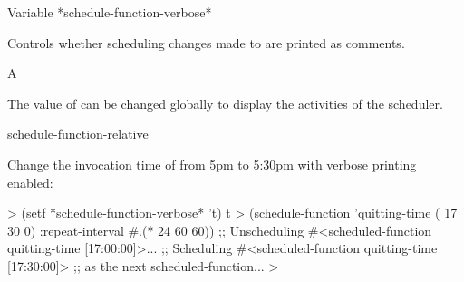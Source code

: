 
\begin{functiondoc}{Variable}%
  {*schedule-function-verbose*}{}%

\fnsyntax

\fnpurpose Controls whether scheduling changes made to
 are printed as comments. 

\fnpackage {}

\fnmodule {}

\fnvaluetype A 

\fninitialvalue \nil

\fndescription The value of  can be
changed globally to display the activities of the 
scheduler.

\begin{alsos}{schedule-function-relative}
\end{alsos}

%
\fnexample Change the invocation time of 
 from 5pm to 5:30pm with verbose printing enabled:
%
\W\supp
\begin{example}
  > (setf *schedule-function-verbose* 't)
  t
  > (schedule-function 'quitting-time ( 17 30 0)
      :repeat-interval #.(* 24 60 60))
  ;; Unscheduling #<scheduled-function quitting-time [17:00:00]>...
  ;; Scheduling #<scheduled-function quitting-time [17:30:00]> 
  ;; as the next scheduled-function...
  >
\end{example}

\end{functiondoc}



